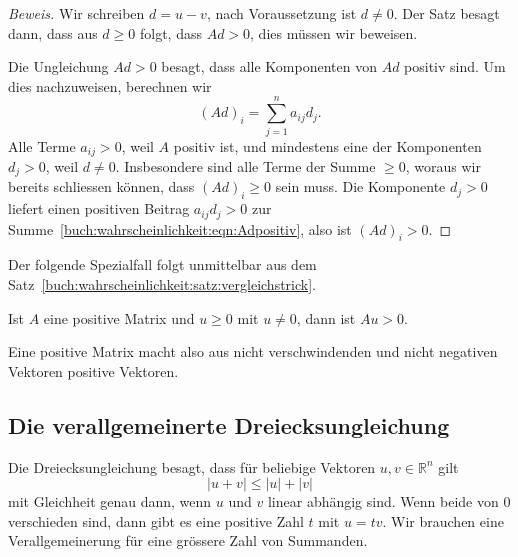 \begin{proof}[Beweis]
Wir schreiben $d=u-v$, nach Voraussetzung ist $d\ne 0$.
Der Satz besagt dann, dass aus $d\ge 0$ folgt, dass $Ad>0$, dies
müssen wir beweisen.

Die Ungleichung $Ad>0$ besagt, dass alle Komponenten von $Ad$ 
positiv sind.
Um dies nachzuweisen, berechnen wir
\begin{equation}
(Ad)_i
=
\sum_{j=1}^n
a_{ij}
d_j.
\label{buch:wahrscheinlichkeit:eqn:Adpositiv}
\end{equation}
Alle Terme $a_{ij}>0$, weil $A$ positiv ist, und mindestens eine
der Komponenten $d_j>0$, weil $d\ne 0$.
Insbesondere sind alle Terme der Summe $\ge 0$, woraus wir
bereits schliessen können, dass $(Ad)_i\ge 0$ sein muss.
Die Komponente $d_j>0$ liefert einen positiven Beitrag
$a_{ij}d_j>0$
zur Summe~\eqref{buch:wahrscheinlichkeit:eqn:Adpositiv},
also ist $(Ad)_i>0$.
\end{proof}

Der folgende Spezialfall folgt unmittelbar aus dem
Satz~\ref{buch:wahrscheinlichkeit:satz:vergleichstrick}.

\begin{korollar}
\label{buch:wahrscheinlichkeit:satz:Au>0korollar}
Ist $A$ eine positive Matrix und $u\ge 0$ mit $u\ne 0$, dann
ist $Au>0$.
\end{korollar}

Eine positive Matrix macht also aus nicht verschwindenden
und nicht negativen Vektoren positive Vektoren.

%
%
\subsection{Die verallgemeinerte Dreiecksungleichung
\label{buch:subsection:verallgemeinerte-dreiecksungleichung}}
Die Dreiecksungleichung besagt, dass für beliebige Vektoren
$u,v\in\mathbb{R}^n$ gilt
\[
|u+v|\le |u|+|v|
\]
mit Gleichheit genau dann, wenn $u$ und $v$ linear abhängig sind.
Wenn beide von $0$ verschieden sind, dann gibt es eine positive Zahl
$t$ mit $u=tv$.
Wir brauchen eine Verallgemeinerung für eine grössere Zahl von
Summanden.

